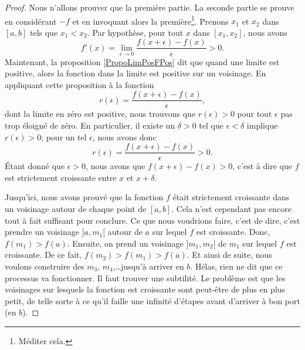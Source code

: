 \begin{proof}
    Nous n'allons prouver que la première partie. La seconde partie se prouve en considérant $-f$ et en invoquant alors la première\footnote{Méditer cela.}. Prenons $x_1$ et $x_2$ dans $[a,b]$ tels que $x_1<x_2$. Par hypothèse, pour tout $x$ dans $[x_1,x_2]$, nous avons
    \begin{equation}
        f'(x)=\lim_{\epsilon\to 0}\frac{ f(x+\epsilon)-f(x) }{\epsilon} >0.
    \end{equation}
    Maintenant, la proposition \ref{PropoLimPosFPos} dit que quand une limite est positive, alors la fonction dans la limite est positive sur un voisinage. En appliquant cette proposition à la fonction
    \begin{equation}
        r(\epsilon)=\frac{ f(x+\epsilon)-f(x) }{ \epsilon },
    \end{equation}
    dont la limite en zéro est positive, nous trouvons que $r(\epsilon)>0$ pour tout $\epsilon$ pas trop éloigné de zéro. En particulier, il existe un $\delta>0$ tel que $\epsilon<\delta$ implique $r(\epsilon)>0$; pour un tel $\epsilon$, nous avons donc
    \begin{equation}
        r(\epsilon)=\frac{ f(x+\epsilon)-f(x) }{ \epsilon }>0.
    \end{equation}
    Étant donné que $\epsilon>0$, nous avons que $f(x+\epsilon)-f(x)>0$, c'est à dire que $f$ est strictement croissante entre $x$ et $x+\delta$.

    Jusqu'ici, nous avons prouvé que la fonction $f$ était strictement croissante dans un voisinage autour de chaque point de $[a,b]$. Cela n'est cependant pas encore tout à fait suffisant pour conclure. Ce que nous voudrions faire, c'est de dire, c'est prendre un voisinage $]a,m_1[$ autour de $a$ sur lequel $f$ est croissante. Donc, $f(m_1)>f(a)$. Ensuite, on prend un voisinage $]m_1,m_2[$ de $m_1$ sur lequel $f$ est croissante. De ce fait, $f(m_2)>f(m_1)>f(a)$. Et ainsi de suite, nous voulons construire des $m_3$, $m_4$,\ldots jusqu'à arriver en $b$. Hélas, rien ne dit que ce processus va fonctionner. Il faut trouver une subtilité. Le problème est que les voisinages sur lesquels la fonction est croissante sont peut-être de plus en plus petit, de telle sorte à ce qu'il faille une infinité d'étapes avant d'arriver à bon port (en $b$).


\end{proof}
